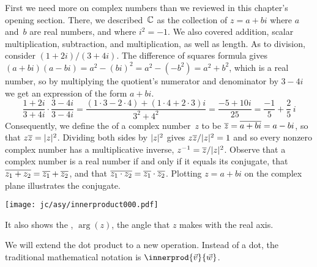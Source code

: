 First we need more on complex numbers than we reviewed in this
chapter's opening section.
There, we described~$\mathbb{C}$ as 
the collection of $z=a+bi$ where $a$ and~$b$ are real numbers,
and where $i^2=-1$. 
We also covered addition, scalar multiplication,
subtraction, and multiplication, as well as length.
As to division,  consider $(1+2i)/(3+4i)$.
The difference of squares formula
gives $(a+bi)(a-bi)=a^2-(bi)^2=a^2-(-b^2)=a^2+b^2$,
which is a real number,
so
by multiplying the quotient's numerator and denominator by $3-4i$
we get an expression of the form $a+bi$.
\begin{equation*}
  \frac{1+2i}{3+4i}\cdot\frac{3-4i}{3-4i}
  =
  \frac{(1\cdot 3-2\cdot 4)+(1\cdot 4+2\cdot 3)i}{3^2+4^2}
  =
  \frac{-5+10i}{25}
  =
  \frac{-1}{5}+\frac{2}{5}\,i
\end{equation*}
Consequently, we define the  of a complex number~$z$
to be $\overline{z}=\overline{a+bi}=a-bi$, so that $z\overline{z}=\lvert z\rvert^2$.
Dividing both sides by $\lvert z\rvert^2$ gives $z\overline{z}/\lvert z\rvert^2=1$
and so  
every nonzero complex number has a multiplicative inverse,
$z^{-1}=\overline{z}/\lvert z\rvert^2$.
Observe that a complex number is a real number if and only if 
it equals its conjugate, 
that $\overline{z_1+z_2}=\overline{z_1}+\overline{z_2}$,
and that $\overline{z_1\cdot z_2}=\overline{z_1}\cdot\overline{z_2}$.
Plotting $z=a+bi$ on the 
complex plane 
illustrates the conjugate.
\begin{center}
  \texttt{[image: jc/asy/innerproduct000.pdf]}
\end{center}
It also shows the , $\arg(z)$, the angle that
$z$ makes with the real axis.

We will extend the dot product to a new operation.
Instead of a dot, the traditional mathematical notation is
$\innerprod{\vec{v}}{\vec{w}}$.

